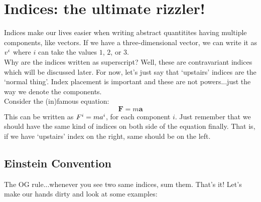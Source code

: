 \section{Indices: the ultimate rizzler!}
Indices make our lives easier when writing abstract quantitites having multiple components, like vectors. If we have a three-dimensional vector, we can write it as $v\indices{^i}$ where $i$ can take the values $1$, $2$, or $3$.\\[0.3cm]
 Why are the indices written as superscript? Well, these are contravariant indices which will be discussed later. For now, let's just say that `upstairs' indices are the `normal thing'. Index placement is important and these are not powers...just the way we denote the components.\\[0.3cm]
 Consider the (in)famous equation: 
 $$\mathbf{F}= m \mathbf{a}$$
 This can be written as $F\indices{^i} = m a\indices{^i}$, for each component $i$. Just remember that we should have the same kind of indices on both side of the equation finally. That is, if we have `upstairs' index on the right, same should be on the left.\\[0.3cm]
 \subsection{Einstein Convention}
 The OG rule...whenever you see two same indices, sum them.  That's it! Let's make our hands dirty and look at some examples:\\[0.3cm]
